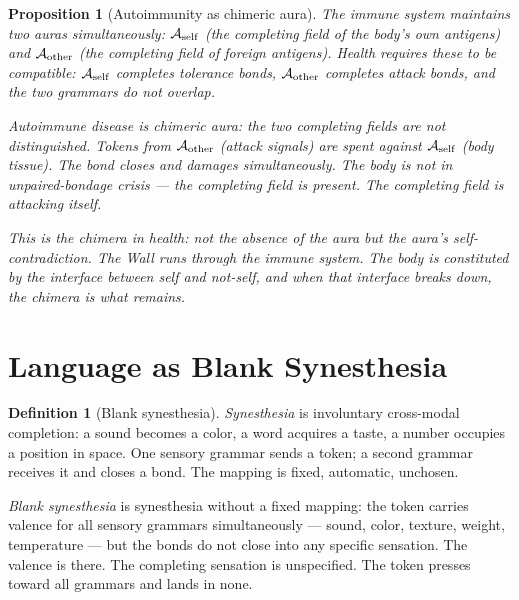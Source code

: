 \documentclass[12pt]{article}
\newtheorem{proposition}[theorem]{Proposition}
\theoremstyle{definition}
\newtheorem{definition}[theorem]{Definition}
\theoremstyle{remark}
\begin{document}
\begin{proposition}[Autoimmunity as chimeric aura]
The immune system maintains two auras simultaneously:
$\mathcal{A}_{\rm self}$ (the completing field of the body's own antigens)
and $\mathcal{A}_{\rm other}$ (the completing field of foreign antigens).
Health requires these to be compatible:
$\mathcal{A}_{\rm self}$ completes tolerance bonds,
$\mathcal{A}_{\rm other}$ completes attack bonds,
and the two grammars do not overlap.

Autoimmune disease is chimeric aura:
the two completing fields are not distinguished.
Tokens from $\mathcal{A}_{\rm other}$ (attack signals)
are spent against $\mathcal{A}_{\rm self}$ (body tissue).
The bond closes and damages simultaneously.
The body is not in unpaired-bondage crisis ---
the completing field is present.
The completing field is attacking itself.

This is the chimera in health:
not the absence of the aura but the aura's self-contradiction.
The Wall runs through the immune system.
The body is constituted by the interface
between self and not-self,
and when that interface breaks down,
the chimera is what remains.
\end{proposition}

\section{Language as Blank Synesthesia}

\begin{definition}[Blank synesthesia]
\emph{Synesthesia} is involuntary cross-modal completion:
a sound becomes a color, a word acquires a taste,
a number occupies a position in space.
One sensory grammar sends a token;
a second grammar receives it and closes a bond.
The mapping is fixed, automatic, unchosen.

\emph{Blank synesthesia} is synesthesia without a fixed mapping:
the token carries valence for all sensory grammars simultaneously ---
sound, color, texture, weight, temperature ---
but the bonds do not close into any specific sensation.
The valence is there. The completing sensation is unspecified.
The token presses toward all grammars and lands in none.
\end{definition}
\end{document}
